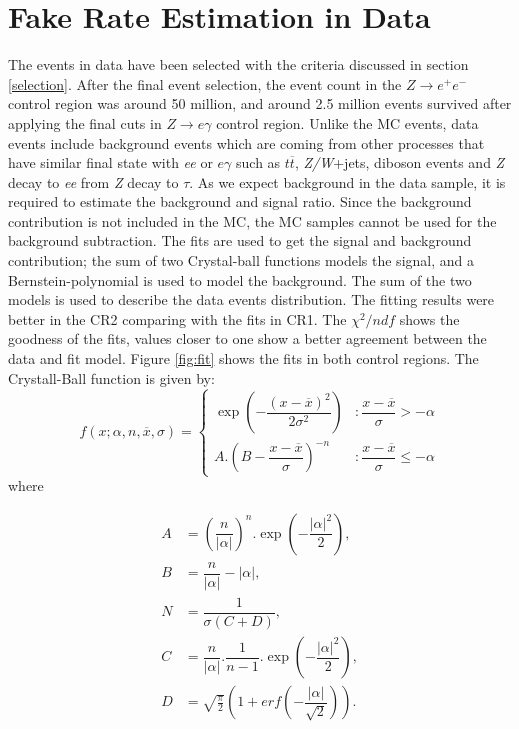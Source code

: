 \section{Fake Rate Estimation in Data}
\label{datafc}
The events in data have been selected with the criteria discussed in section \ref{selection}. After the final event selection, the event count in the $Z \rightarrow e^{+}e^{-}$ control region was around 50 million, and around 2.5 million events survived after applying the final cuts in $Z \rightarrow e\gamma$ control region. Unlike the MC events, data events include background events which are coming from other processes that have similar final state with \textit{ee} or $e\gamma$ such as $t\overline{t}$, \textit{Z/W}+jets, diboson events and \textit{Z} decay to \textit{ee} from \textit{Z} decay to $\tau$. As we expect background in the data sample, it is required to estimate the background and signal ratio. Since the background contribution is not included in the MC, the MC samples cannot be used for the background subtraction. The fits are used to get the signal and background contribution; the sum of two Crystal-ball functions models the signal, and a Bernstein-polynomial is used to model the background. The sum of the two models is used to describe the data events distribution. The fitting results were better in the CR2 comparing with the fits in CR1. The $\chi^2 /ndf$ shows the goodness of the fits, values closer to one show a better agreement between the data and fit model. Figure \ref{fig:fit} shows the fits in both control regions.
The Crystall-Ball function is given by:
\[f(x;\alpha,n,\overline{x},\sigma) = \left\{
  \begin{array}{lr}
    \exp(-\dfrac{(x-\overline{x})^2}{2\sigma^2}) & : \dfrac{x-\overline{x}}{\sigma} > -\alpha\\
    A.(B-\dfrac{x-\overline{x}}{\sigma})^{-n} & : \dfrac{x-\overline{x}}{\sigma} \leq -\alpha
  \end{array}
\right.
\]
where

\begin{equation}
\begin{split}
A & = (\dfrac{n}{|\alpha|})^n .\exp(-\dfrac{|\alpha|^2}{2}), \\
B & = \dfrac{n}{|\alpha|} - |\alpha|, \\
N & = \dfrac{1}{\sigma(C + D)}, \\
C & = \dfrac{n}{|\alpha|}. \dfrac{1}{n-1} .\exp(-\dfrac{|\alpha|^2}{2}), \\
D & = \sqrt{\frac{\pi}{2}} (1+erf(-\dfrac{|\alpha|}{\sqrt{2}})).
\end{split}
\end{equation}

